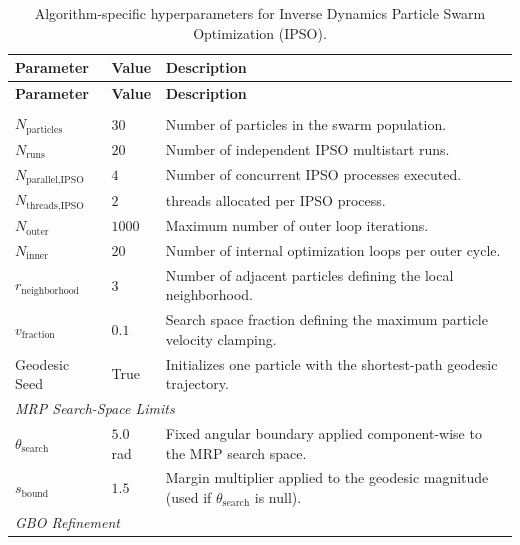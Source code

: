 \begin{longtable}{@{}p{}p{}p{}@{}}
    \caption{Algorithm-specific hyperparameters for Inverse Dynamics Particle Swarm Optimization (IPSO).}
    \label{tab:params_ipso}\\
        \toprule
        \textbf{Parameter} & \textbf{Value} & \textbf{Description} \\
        \midrule
\endfirsthead

        \toprule
        \textbf{Parameter} & \textbf{Value} & \textbf{Description} \\
        \midrule
\endhead

        \bottomrule
\endfoot

        \multicolumn{3}{l}{\textit{Execution \& Swarm Dynamics}} \\
        $N_{\text{particles}}$ & $30$ & Number of particles in the swarm population. \\
        $N_{\text{runs}}$ & $20$ & Number of independent IPSO multistart runs. \\
        $N_{\text{parallel,IPSO}}$ & $4$ & Number of concurrent IPSO processes executed. \\
        $N_{\text{threads,IPSO}}$ & $2$ & threads allocated per IPSO process. \\
        $N_{\text{outer}}$ & $1000$ & Maximum number of outer loop iterations. \\
        $N_{\text{inner}}$ & $20$ & Number of internal optimization loops per outer cycle. \\
        $r_{\text{neighborhood}}$ & $3$ & Number of adjacent particles defining the local neighborhood. \\
        $v_{\text{fraction}}$ & $0.1$ & Search space fraction defining the maximum particle velocity clamping. \\
        Geodesic Seed & True & Initializes one particle with the shortest-path geodesic trajectory. \\
        \midrule
        \multicolumn{3}{l}{\textit{MRP Search-Space Limits}} \\
        $\theta_{\text{search}}$ & $5.0$\,rad & Fixed angular boundary applied component-wise to the MRP search space. \\
        $s_{\text{bound}}$ & $1.5$ & Margin multiplier applied to the geodesic magnitude (used if $\theta_{\text{search}}$ is null). \\
        \midrule
        \multicolumn{3}{l}{\textit{GBO Refinement}} \\

\end{longtable}
